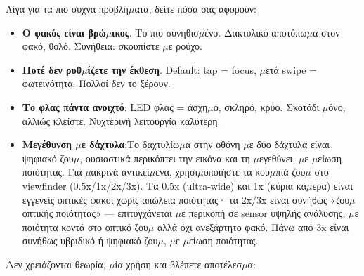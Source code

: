 


Λίγα για τα πιο συχνά προβλή$\mu$ατα, δείτε πόσα σας αφορούν:

\begin{itemize}
  \item \textbf{Ο φακός είναι βρώ$\mu$ικος}. Το πιο συνηθισ$\mu$ένο. Δακτυλικό αποτύπω$\mu$α στον φακό, θολό. Συνήθεια: σκουπίστε $\mu$ε ρούχο.
  \item \textbf{Ποτέ δεν ρυθ$\mu$ίζετε την έκθεση}. Default: tap = focus, $\mu$ετά swipe = φωτεινότητα. Πολλοί δεν το ξέρουν.
  \item \textbf{Το φλας πάντα ανοιχτό}: LED φλας = άσχη$\mu$ο, σκληρό, κρύο. Σκοτάδι $\mu$όνο, αλλιώς κλείστε. Νυχτερινή λειτουργία καλύτερη.
  \item \textbf{Μεγέθυνση $\mu$ε δάχτυλα}:Το δαχτυλίω$\mu$α στην οθόνη $\mu$ε δύο δάχτυλα είναι ψηφιακό ζου$\mu$, ουσιαστικά περικόπτει την εικόνα και τη $\mu$εγεθύνει, $\mu$ε $\mu$είωση ποιότητας. Για $\mu$ακρινά αντικεί$\mu$ενα, χρησι$\mu$οποιήστε τα κου$\mu$πιά ζου$\mu$ στο viewfinder (0.5x/1x/2x/3x). Τα 0.5x (ultra-wide) και 1x (κύρια κά$\mu$ερα) είναι εγγενείς οπτικές φακοί χωρίς απώλεια ποιότητας· τα 2x/3x είναι συνήθως «ζου$\mu$ οπτικής ποιότητας» — επιτυγχάνεται $\mu$ε περικοπή σε sensor υψηλής ανάλυσης, $\mu$ε ποιότητα κοντά στο οπτικό ζου$\mu$ αλλά όχι ανεξάρτητο φακό. Πάνω από 3x είναι συνήθως υβριδικό ή ψηφιακό ζου$\mu$, $\mu$ε $\mu$είωση ποιότητας.
\end{itemize}


Δεν χρειάζονται θεωρία, $\mu$ία χρήση και βλέπετε αποτέλεσ$\mu$α:

